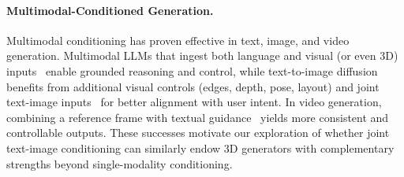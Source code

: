 \paragraph{Multimodal-Conditioned Generation.}
Multimodal conditioning has proven effective in text, image, and video generation. Multimodal LLMs that ingest both language and visual (or even 3D) inputs~\cite{llava,qwenvl,instructblip,internvl,3dllm,pointllm,ll3da} enable grounded reasoning and control, while text-to-image diffusion benefits from additional visual controls (edges, depth, pose, layout) and joint text-image inputs~\cite{controlnet,t2i,ipadapter,qwenimage,bagel,instructp2p} for better alignment with user intent. In video generation, combining a reference frame with textual guidance~\cite{makeitmove,wan} yields more consistent and controllable outputs. These successes motivate our exploration of whether joint text-image conditioning can similarly endow 3D generators with complementary strengths beyond single-modality conditioning.